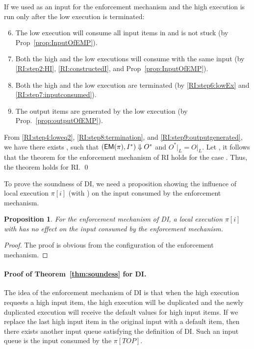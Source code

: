 \documentclass[10pt,a4paper,oneside]{article}
\newtheorem{proposition}{Proposition}[section]
\def\execution#1#2#3{\ensuremath{(#1, #2)\Downarrow#3}}
\def\loweq#1#2{\ensuremath{\restrict{#1}{L} = \restrict{#2}{L}}}
\def\restrict#1#2{\ensuremath{{#1}|_{#2}}}
\def\TOP{\ensuremath{TOP}}
\def\sanserif#1{\ensuremath{\sf #1}}
\def\EM{\ensuremath{{\sanserif{EM}}}}
\def\Prog{\ensuremath{\pi}}
\def\Progl#1{\ensuremath{\Prog[#1]}}
\def\EMP{\ensuremath{\EM(}\ensuremath{\Prog)}}
\begin{document}
If we used  as an input for the enforcement mechanism and the high execution is run only after the low execution is terminated:
\begin{enumerate}
\setcounter{enumi}{5}
\item The low execution will consume all input items in  and is not stuck (by Prop~\ref{prop:InputOfEMP}). \label{RI:step6:lowEx}


\item Both the high and the low executions will consume with the same input (by \ref{RI:step2:HI}, \ref{RI:constructedI}, and Prop~\ref{prop:InputOfEMP}). \label{RI:step7:inputconsumed}

\item \label{termination} Both the high and the low execution are terminated (by \ref{RI:step6:lowEx} and \ref{RI:step7:inputconsumed}). \label{RI:step8:termination}

\item The output items are generated by the low execution (by Prop.~\ref{prop:outputOfEMP}). \label{RI:step9:outputgenerated}
\end{enumerate}


From \ref{RI:step4:loweq2}, \ref{RI:step8:termination}, and \ref{RI:step9:outputgenerated}, we have there exists , such that \execution{\EMP}{I^*}{O^*} and \loweq{O^*}{O}. Let , it follows that the theorem for the enforcement mechanism of RI holds for the case . Thus, the theorem holds for RI. \qed

To prove the soundness of DI, we need a proposition showing the influence of local execution \Progl{i} (with ) on the input consumed by the enforcement mechanism.



\begin{proposition} \label{prop:DI:inputconsumed}
For the enforcement mechanism of DI, a local execution \Progl{i} with  has no effect on the input consumed by the enforcement mechanism.
\end{proposition}
\begin{proof}
The proof is obvious from the configuration of the enforcement mechanism.
\end{proof}


\paragraph{Proof of Theorem~\ref{thm:soundess} for DI.}
The idea of the enforcement mechanism of DI is that when the high execution requests a high input item, the high execution will be duplicated and the newly duplicated execution will receive the default values for high input items. If we replace the last high input item in the original input  with a default item, then there exists another input queue satisfying the definition of DI. Such an input queue is the input consumed by the \Progl{\TOP}.
\end{document}
